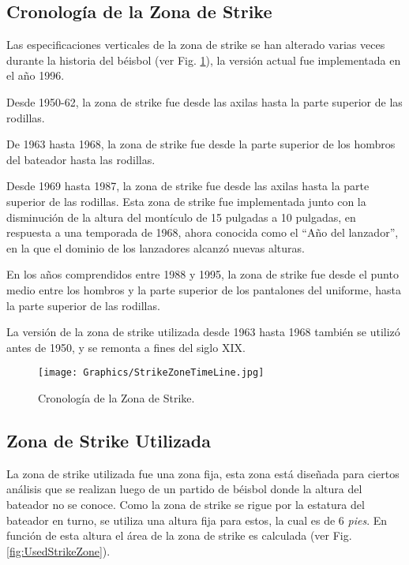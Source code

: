\subsection{Cronología de la Zona de Strike}

Las especificaciones verticales de la zona de strike se han alterado varias veces durante la historia del béisbol (ver Fig. \ref{fig:StrikeZoneTimeLine}), la versión actual fue implementada en el año 1996.

Desde 1950-62, la zona de strike fue desde las axilas hasta la parte superior de las rodillas.

De 1963 hasta 1968, la zona de strike fue desde la parte superior de los hombros del bateador hasta las rodillas.

Desde 1969 hasta 1987, la zona de strike fue desde las axilas hasta la parte superior de las rodillas. Esta zona de strike fue implementada junto con la disminución de la altura del montículo de 15 pulgadas a 10 pulgadas, en respuesta a una temporada de 1968, ahora conocida como el ``Año del lanzador'', en la que el dominio de los lanzadores alcanzó nuevas alturas.

En los años comprendidos entre 1988 y 1995, la zona de strike fue desde el punto medio entre los hombros y la parte superior de los pantalones del uniforme, hasta la parte superior de las rodillas.

La versión de la zona de strike utilizada desde 1963 hasta 1968 también se utilizó antes de 1950, y se remonta a fines del siglo XIX.

\begin{figure}[!h]
    \centering
    \texttt{[image: Graphics/StrikeZoneTimeLine.jpg]}
    \caption{Cronología de la Zona de Strike.}
    \label{fig:StrikeZoneTimeLine}
\end{figure}

\subsection{Zona de Strike Utilizada}

La zona de strike utilizada fue una zona fija, esta zona está diseñada para ciertos análisis que se realizan luego de un partido de béisbol donde la altura del bateador no se conoce. Como la zona de strike se rigue por la estatura del bateador en turno, se utiliza una altura fija para estos, la cual es de 6 \textit{pies}. En función de esta altura el área de la zona de strike es calculada (ver Fig. \ref{fig:UsedStrikeZone}).

